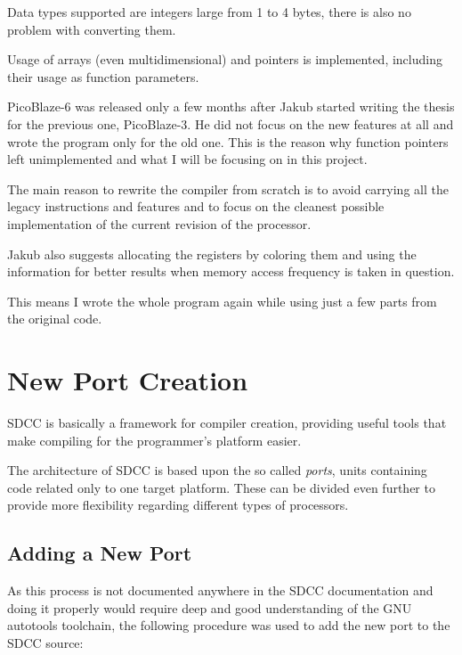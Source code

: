     Data types supported are integers large from 1 to 4 bytes, there is also no problem with converting them.

    Usage of arrays (even multidimensional) and pointers is implemented, including their usage as function parameters.

    PicoBlaze-6 was released only a few months after Jakub started writing the thesis for the previous one, PicoBlaze-3. 
    He did not focus on the new features at all and wrote the program only for the old one.
    This is the reason why function pointers left unimplemented and what I will be focusing on in this project.

    The main reason to rewrite the compiler from scratch is to avoid carrying all the legacy instructions and features and to focus on the cleanest possible implementation of the current revision of the processor.

    Jakub also suggests allocating the registers by coloring them and using the information for better results when memory access frequency is taken in question.

    This means I wrote the whole program again while using just a few parts from the original code.


\chapter{New Port Creation}\label{port}

SDCC is basically a framework for compiler creation, providing useful tools that make compiling for the programmer's platform easier.

The architecture of SDCC is based upon the so called \emph{ports}, units containing code related only to one target platform. These can be divided even further to provide more flexibility regarding different types of processors.

    \section{Adding a New Port}

    As this process is not documented anywhere in the SDCC documentation and doing it properly would require deep and good understanding of the GNU autotools toolchain, the following procedure was used to add the new port to the SDCC source:


